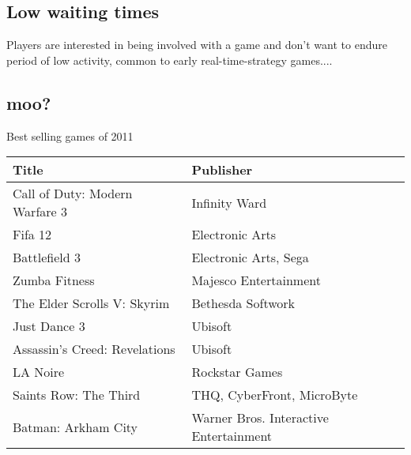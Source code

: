 \subsection*{Low waiting times}
Players are interested in being involved with a game and don't want to endure period of low activity, common to early real-time-strategy games....


\subsection*{moo?}

Best selling games of 2011 \\
\begin{tabular}{l l}
    Title & Publisher\\
	\hline \hline
	Call of Duty: Modern Warfare 3 & Infinity Ward
	\\
	Fifa 12 & Electronic Arts
	\\
	Battlefield 3 & Electronic Arts, Sega
	\\
	Zumba Fitness & Majesco Entertainment
	\\
	The Elder Scrolls V: Skyrim & Bethesda Softwork
	\\
	Just Dance 3 & Ubisoft
	\\
	Assassin's Creed: Revelations & Ubisoft
	\\
	LA Noire & Rockstar Games
	\\
	Saints Row: The Third & THQ, CyberFront, MicroByte
	\\
	Batman: Arkham City & Warner Bros. Interactive Entertainment 
	\\
\end{tabular}

